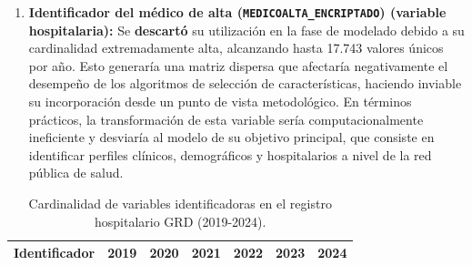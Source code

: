 \begin{enumerate}
    \item \textbf{Identificador del médico de alta (\texttt{MEDICOALTA\_ENCRIPTADO}) (variable hospitalaria):} Se \textbf{descartó} su utilización en la fase de modelado debido a su cardinalidad extremadamente alta, alcanzando hasta 17.743 valores únicos por año. Esto generaría una matriz dispersa que afectaría negativamente el desempeño de los algoritmos de selección de características, haciendo inviable su incorporación desde un punto de vista metodológico. En términos prácticos, la transformación de esta variable sería computacionalmente ineficiente y desviaría al modelo de su objetivo principal, que consiste en identificar perfiles clínicos, demográficos y hospitalarios a nivel de la red pública de salud.
\end{enumerate}

\begin{table}[htbp]
\centering
\scriptsize
\setlength{\tabcolsep}{3pt}
\renewcommand{\arraystretch}{1.2}
\caption{Cardinalidad de variables identificadoras en el registro hospitalario GRD (2019-2024).}
\label{tab:cardinalidad_identificadores}
\begin{tabular}{|c|c|c|c|c|c|c|}
\hline
\parbox[t]{2.5cm}{\centering\textbf{Identificador}} & 
\parbox[t]{1.8cm}{\centering\textbf{2019}} & 
\parbox[t]{1.8cm}{\centering\textbf{2020}} & 
\parbox[t]{1.8cm}{\centering\textbf{2021}} & 
\parbox[t]{1.8cm}{\centering\textbf{2022}} & 
\parbox[t]{1.8cm}{\centering\textbf{2023}} & 
\parbox[t]{1.8cm}{\centering\textbf{2024}} \\ \hline


\end{tabular}
\end{table}

